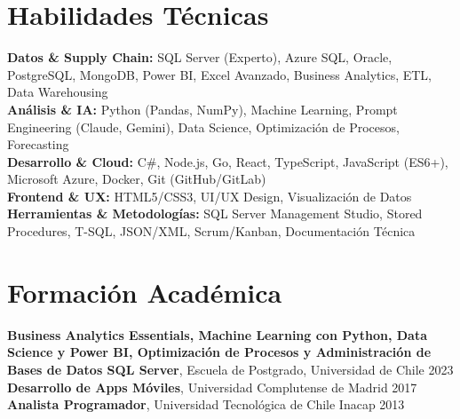 \documentclass[11pt,letterpaper]{article}
\begin{document}
\section{Habilidades T\'{e}cnicas}
\textbf{Datos \& Supply Chain:} SQL Server (Experto), Azure SQL, Oracle, PostgreSQL, MongoDB, Power BI, Excel Avanzado, Business Analytics, ETL, Data Warehousing \\
\textbf{Análisis \& IA:} Python (Pandas, NumPy), Machine Learning, Prompt Engineering (Claude, Gemini), Data Science, Optimización de Procesos, Forecasting \\
\textbf{Desarrollo \& Cloud:} C\#, Node.js, Go, React, TypeScript, JavaScript (ES6+), Microsoft Azure, Docker, Git (GitHub/GitLab) \\
\textbf{Frontend \& UX:} HTML5/CSS3, UI/UX Design, Visualización de Datos \\
\textbf{Herramientas \& Metodologías:} SQL Server Management Studio, Stored Procedures, T-SQL, JSON/XML, Scrum/Kanban, Documentación Técnica

\section{Formaci\'{o}n Acad\'{e}mica}
\textbf{Business Analytics Essentials, Machine Learning con Python, Data Science y Power BI, Optimización de Procesos y Administración de Bases de Datos SQL Server}, Escuela de Postgrado, Universidad de Chile \hfill 2023 \\
\textbf{Desarrollo de Apps Móviles}, Universidad Complutense de Madrid \hfill 2017 \\
\textbf{Analista Programador}, Universidad Tecnológica de Chile Inacap \hfill 2013
\end{document}
